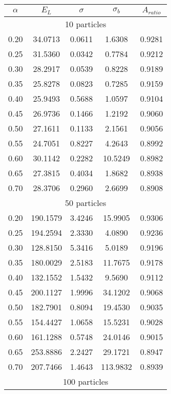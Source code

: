 \documentclass[
    a4paper, aps, twocolumn, floatfix, superscriptaddress,
    nofootinbib]{revtex4-1}
\begin{document}
\begin{table}[H]
{\begin{ruledtabular}
\begin{tabular}{ccccc}
$\alpha$ & $E_L$   & $\sigma$ & $\sigma_b$ & $A_{ratio}$ \\
\hline
    \multicolumn{5}{c}{10 particles} \\              
\hline
0.20     & 34.0713 & 0.0611   & 1.6308     & 0.9281        \\
0.25     & 31.5360 & 0.0342   & 0.7784     & 0.9212       \\
0.30     & 28.2917 & 0.0539   & 0.8228     & 0.9189         \\
0.35     & 25.8278 & 0.0823   & 0.7285     & 0.9159        \\
0.40     & 25.9493 & 0.5688   & 1.0597     & 0.9104         \\
0.45     & 26.9736 & 0.1466   & 1.2192     & 0.9060         \\
0.50     & 27.1611 & 0.1133   & 2.1561     & 0.9056     \\
0.55     & 24.7051 & 0.8227   & 4.2643     & 0.8992        \\
0.60     & 30.1142 & 0.2282   & 10.5249    & 0.8982    \\
0.65     & 27.3815 & 0.4034   & 1.8682     & 0.8938       \\
0.70     & 28.3706 & 0.2960   & 2.6699     & 0.8908      \\
\hline
\multicolumn{5}{c}{50 particles}               \\
\hline
0.20     & 190.1579 & 3.4246   & 15.9905    & 0.9306     \\
0.25     & 194.2594 & 2.3330   & 4.0890     & 0.9236       \\
0.30     & 128.8150 & 5.3416   & 5.0189     & 0.9196      \\
0.35     & 180.0029 & 2.5183   & 11.7675    & 0.9178    \\
0.40     & 132.1552 & 1.5432   & 9.5690     & 0.9112        \\
0.45     & 200.1127 & 1.9996   & 34.1202    & 0.9068     \\
0.50     & 182.7901 & 0.8094   & 19.4530    & 0.9035       \\
0.55     & 154.4427 & 1.0658   & 15.5231    & 0.9028    \\
0.60     & 161.1288 & 0.5748   & 24.0146    & 0.9015        \\
0.65     & 253.8886 & 2.2427   & 29.1721    & 0.8947       \\
0.70     & 207.7466 & 1.4643   & 113.9832   & 0.8939       \\
\hline
\multicolumn{5}{c}{100 particles}               \\
\hline


\end{tabular}
\end{ruledtabular}}
\end{table}
\end{document}
